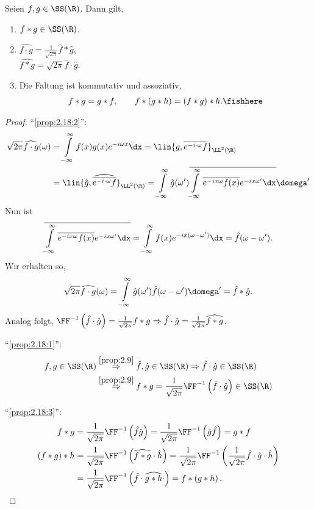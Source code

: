 \begin{prop}
\label{prop:2.18}
Seien $f,g\in\SS(\R)$. Dann gilt,
\begin{enumerate}[label=\arabic{*}.)]
  \item\label{prop:2.18:1} $f*g\in\SS(\R)$.
  \item\label{prop:2.18:2} $\widehat{f\cdot g} = \frac{1}{\sqrt{2\pi}}
  \hat{f}*\hat{g}$,\\
  $\widehat{f*g} = \sqrt{2\pi} \hat{f}\cdot\hat{g}$.
  \item\label{prop:2.18:3} Die Faltung ist kommutativ und assoziativ,
\begin{align*}
f*g = g*f,\qquad f*(g*h) = (f*g)*h.\fishhere
\end{align*}
\end{enumerate}
\end{prop}
\begin{proof}
``\ref{prop:2.18:2}'':
\begin{align*}
\sqrt{2\pi} \widehat{f\cdot g}(\omega) &=
\int\limits_{-\infty}^\infty f(x)g(x)e^{-i\omega x}\dx
= \lin{g,\overline{e^{-i\cdot\omega}f}}_{\LL^2(\R)}
\\ &= \lin{\hat{g},\widehat{\overline{e^{-i\cdot\omega}f}}}_{\LL^2(\R)}
=  \int\limits_{-\infty}^\infty \hat{g}(\omega')
\overline{\int\limits_{-\infty}^\infty \overline{e^{-ix\omega}f(x)}
e^{-ix\omega'}\dx}\domega'
\end{align*}
Nun ist
\begin{align*}
\overline{\int\limits_{-\infty}^\infty \overline{e^{-ix\omega}f(x)}
e^{-ix\omega'}\dx}
= 
\int\limits_{-\infty}^\infty f(x)e^{-ix(\omega-\omega')}
\dx = \hat{f}(\omega-\omega').
\end{align*}
Wir erhalten so,
\begin{align*}
\sqrt{2\pi} \widehat{f\cdot g}(\omega) = 
\int\limits_{-\infty}^\infty \hat{g}(\omega')
\hat{f}(\omega-\omega')\domega' = \hat{f}*\hat{g}.
\end{align*}
Analog folgt, $\FF^{-1}\left(\hat{f}\cdot\hat{g}\right) =
\frac{1}{\sqrt{2\pi}} f* g \Rightarrow \hat{f}\cdot\hat{g} =
\frac{1}{\sqrt{2\pi}} \widehat{f*g}$.

``\ref{prop:2.18:1}'':
\begin{align*}
f,g\in\SS(\R) &\overset{\ref{prop:2.9}}{\Rightarrow} \hat{f},\hat{g}\in\SS(\R)
\Rightarrow \hat{f}\cdot\hat{g}\in\SS(\R)\\
&\overset{\ref{prop:2.9}}{\Rightarrow} f*g =
\frac{1}{\sqrt{2\pi}}\FF^{-1}\left(\hat{f}\cdot\hat{g}\right) \in\SS(\R)
\end{align*}

``\ref{prop:2.18:3}'':
\begin{align*}
f*g &= \frac{1}{\sqrt{2\pi}}\FF^{-1}\left(\hat{f}\hat{g}\right) =
\frac{1}{\sqrt{2\pi}}\FF^{-1}\left(\hat{g}\hat{f}\right) = g*f\\
\left(f*g\right)*h &= 
\frac{1}{\sqrt{2\pi}}\FF^{-1}\left(\widehat{f*g}\cdot \hat{h}\right)=
\frac{1}{\sqrt{2\pi}}\FF^{-1}\left(\frac{1}{\sqrt{2\pi}}\hat{f}\cdot\hat{g}\cdot
\hat{h}\right) \\ &= 
\frac{1}{\sqrt{2\pi}}\FF^{-1}\left(\hat{f}\cdot \widehat{g*h}\cdot
\right)= f*\left(g*h\right).\qedhere
\end{align*}
\end{proof}

